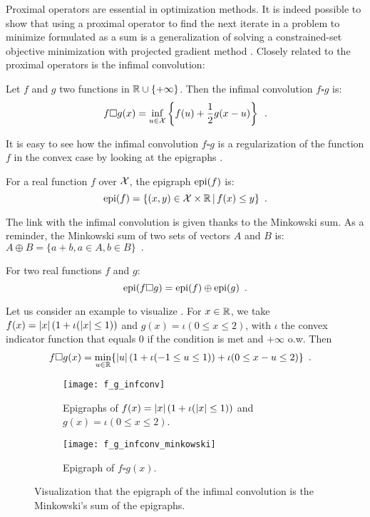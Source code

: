 \documentclass[../main.tex]{subfiles}
\begin{document}
Proximal operators are essential in optimization methods. It is indeed possible
to show \citep[p.~270]{Beck17} that using a proximal operator to find the next
iterate in a problem to minimize formulated as a sum
is a generalization of solving a constrained-set objective minimization with
projected gradient method \citep{combettes2011proximal}.
Closely related to the proximal operators is the infimal convolution:

\begin{definition}\label{def:infconv}
	Let $f$ and $g$ two functions in $\mathbb{R} \cup \{+\infty\}$.
	Then the infimal convolution $f\square g$ is:
	\begin{equation}
		f\square g(x)
		= \inf_{u\in\mathcal{X}} \left\{f(u) + \frac{1}{2} g(x-u) \right\}\enspace.
	\end{equation}
\end{definition}

It is easy to see how the infimal convolution $f\square g$ is a regularization
of the function $f$ in the convex case by looking at
the epigraphs \citep{fajardo2012infimal}.
\begin{definition}\label{def:epigraph}
For a real function $f$ over $\mathcal{X}$, the epigraph $\operatorname{epi}(f)$ is:
\[\operatorname{epi}(f)=\{(x, y)\in \mathcal{X}\times \mathbb{R}\,|\, f(x)\leq y\}\enspace.\]
\end{definition}
The link with the infimal convolution is given thanks to the Minkowski sum.
As a reminder, the Minkowski sum of two sets of vectors $A$ and $B$ is:
$A\oplus B = \{a+b, a\in A, b\in B\}\enspace.$

\begin{proposition*}
    For two real functions $f$ and $g$:
    \begin{equation}\label{prop:epi}
    \operatorname{epi}(f\square g) = \operatorname{epi}(f)\oplus \operatorname{epi}(g)\enspace.
    \end{equation}
\end{proposition*}

Let us consider an example to visualize .
For $x\in\mathbb{R}$, we take $f(x)=\left \vert x \right \vert(1+\iota(\left \vert x \right \vert\leq 1))$ and
$g(x)=\iota(0\leq x \leq 2)$, with $\iota$ the convex indicator function that
equals $0$ if the condition is met and $+\infty$ o.w.
Then
\begin{align*}
    f\square g(x)
	&= \min_{u\in\mathbb{R}} \{\left \vert u \right \vert (1 + \iota (-1\leq u \leq 1))
	+ \iota(0\leq x-u\leq 2)\}
	\enspace.
\end{align*}

\begin{figure}[h!]
	\centering
	\begin{subfigure}{.4\textwidth}
		\centering
		\texttt{[image: f\_g\_infconv]}
		\caption{Epigraphs of $f(x)=\left \vert x \right \vert(1+\iota(\left \vert x \right \vert\leq 1))$ and
		$g(x)=\iota(0\leq x \leq 2)$.}
	\end{subfigure}
	\begin{subfigure}{.4\textwidth}
		\centering
		\texttt{[image: f\_g\_infconv\_minkowski]}
		\caption{Epigraph of $f\square g(x)$.}
	\end{subfigure}
	\caption{Visualization that the epigraph of the infimal convolution is the
	Minkowski's sum of the epigraphs.}
\end{figure}
\end{document}
